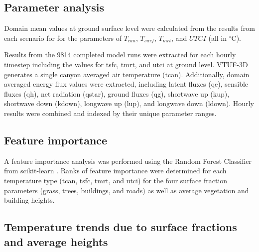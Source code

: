 \documentclass[final,3p,times,authoryear]{elsarticle}
\begin{document}
\subsection{Parameter analysis}\label{sec:methodsparam}

Domain mean values at ground surface level were calculated from the results from each scenario for for the parameters of $T_{can}$, $T_{surf}$, $T_{mrt}$, and $UTCI$ (all in $^{\circ}$C). 

Results from the 9814 completed model runs were extracted for each hourly timestep including the values for \gls{tsfc}, \gls{tmrt}, and \gls{utci} at ground level. VTUF-3D generates a single canyon averaged air temperature (\gls{tcan}). Additionally, domain averaged energy flux values were extracted, including latent fluxes (\gls{qe}), sensible fluxes (\gls{qh}), net radiation (\gls{qstar}), ground fluxes (\gls{qg}), shortwave up (\gls{kup}), shortwave down (\gls{kdown}), longwave up (\gls{lup}), and longwave down (\gls{ldown}). Hourly results were combined and indexed by their unique parameter ranges.

\subsection{Feature importance}\label{sec:methodsfeat}
%

A feature importance analysis was performed using the Random Forest Classifier from  scikit-learn \citep{scikit-learn}. Ranks of feature importance were determined for each temperature type (\gls{tcan}, \gls{tsfc}, \gls{tmrt}, and \gls{utci}) for the four surface fraction parameters (grass, trees, buildings, and roads) as well as average vegetation and building heights.


\subsection{Temperature trends due to surface fractions and average heights}\label{sec:methodstempvspercent}
\end{document}

